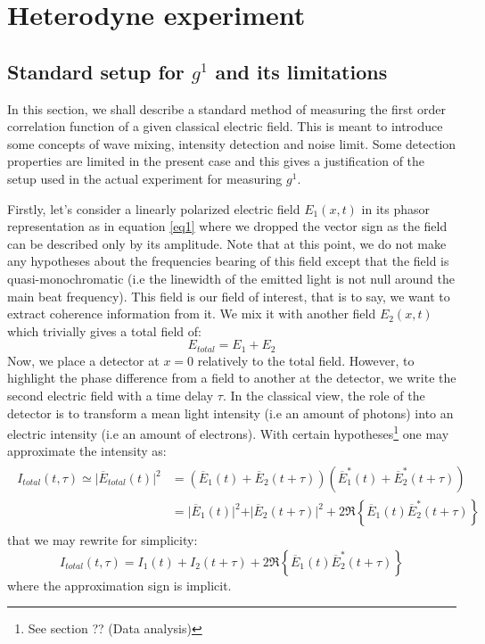 \documentclass[11pt]{report}
\begin{document}
\chapter{Heterodyne experiment}
\section{Standard setup for $g^1$ and its limitations}

In this section, we shall describe a standard method of measuring the first order correlation function of a given classical electric field. This is meant to introduce some concepts of wave mixing, intensity detection and noise limit. Some detection properties are limited in the present case and this gives a justification of the setup used in the actual experiment for measuring $g^1$.

Firstly, let's consider a linearly polarized electric field $E_1(x, t)$ in its phasor representation as in equation \eqref{eq1} where we dropped the vector sign as the field can be described only by its amplitude. Note that at this point, we do not make any hypotheses about the frequencies bearing of this field except that the field is quasi-monochromatic (i.e the linewidth of the emitted light is not null around the main beat frequency). This field is our field of interest, that is to say, we want to extract coherence information from it. We mix it with another field $E_2(x, t)$ which trivially gives a total field of:
\begin{equation}
\label{e_tot_def}
E_{total} = E_1 + E_2
\end{equation}
Now, we place a detector at $x=0$ relatively to the total field. However, to highlight the phase difference from a field to another at the detector, we write the second electric field with a time delay $\tau$. In the classical view, the role of the detector is to transform a mean light intensity (i.e an amount of photons) into an electric intensity (i.e an amount of electrons). With certain hypotheses\footnote{See section ?? (Data analysis)} one may approximate the intensity as:
\begin{align}
\begin{split}
I_{total}(t, \tau) \simeq \vert\overline{E}_{total}(t)\vert^2 &= (\overline{E}_1(t) + \overline{E}_2(t + \tau))(\overline{E}_1^*(t) + \overline{E}_2^*(t + \tau))\\
&= \vert \overline{E}_1(t) \vert^2 + \vert \overline{E}_2(t + \tau) \vert^2 + 2\Re\left\lbrace \overline{E}_1(t)\overline{E}_2^*(t + \tau)\right\rbrace
\end{split}
\end{align}
that we may rewrite for simplicity:
\begin{equation}
I_{total}(t, \tau) = I_1(t) + I_2(t + \tau) + 2\Re\left\lbrace \overline{E}_1(t) \overline{E}_2^*(t + \tau)\right\rbrace
\end{equation}
where the approximation sign is implicit.
\end{document}
